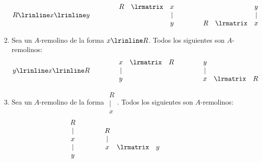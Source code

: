 \begin{enumerate}
        $$R \lrinline x \lrinline y
        \hspace{15mm}
        \begin{matrix}
           R & \lrmatrix & x \\
             &   & |\\
             &   & y
         \end{matrix}
         \hspace{15mm}
         \begin{matrix}
             &   & y \\
             &   & |\\
           R & \lrmatrix & x
         \end{matrix}$$
    \item Sea un $A$-remolino de la forma $x \lrinline R$. Todos los siguientes son $A$-remolinos:
      $$y \lrinline x \lrinline R
        \hspace{15mm}
        \begin{matrix}
          x & \lrmatrix & R \\
          | &   &\\
          y &   &
        \end{matrix}
        \hspace{15mm}
        \begin{matrix}
          y  &   &\\
          |  &   &\\
          x & \lrmatrix & R
         \end{matrix}$$
    \item Sea un $A$-remolino de la forma $\begin{matrix}R \\ | \\ x \end{matrix}$.
    Todos los siguientes son $A$-remolinos:
      $$\begin{matrix}
        R\\
        |\\
        x\\
        |\\
        y
      \end{matrix}
        \hspace{15mm}
        \begin{matrix}
          R  &   &\\
          |  &   &\\
          x & \lrmatrix & y
         \end{matrix}
        \hspace{15mm}
$$
\end{enumerate}

